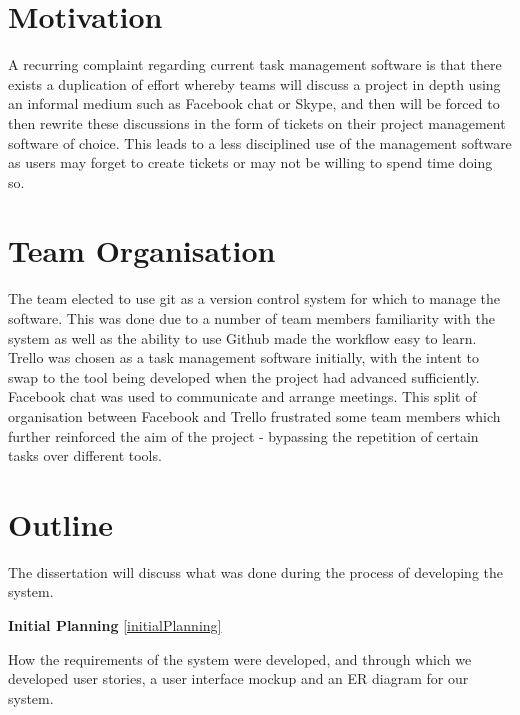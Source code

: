 \documentclass[a4paper]{l3proj}
\begin{document}
\section{Motivation}
\label{motivation}

A recurring complaint regarding current task management software is that there exists a duplication of effort whereby teams will discuss a project in depth using an informal medium such as Facebook chat or Skype, and then will be forced to then rewrite these discussions in the form of tickets on their project management software of choice.  This leads to a less disciplined use of the management software as users may forget to create tickets or may not be willing to spend time doing so.

\section{Team Organisation}
\label{teamOrganisation}

The team elected to use git as a version control system for which to manage the software.  This was done due to a number of team members familiarity with the system as well as the ability to use Github made the workflow easy to learn.  Trello was chosen as a task management software initially, with the intent to swap to the tool being developed when the project had advanced sufficiently.  Facebook chat was used to communicate and arrange meetings.  This split of organisation between Facebook and Trello frustrated some team members which further reinforced the aim of the project - bypassing the repetition of certain tasks over different tools.

\section{Outline}
\label{outline}

The dissertation will discuss what was done during the process of developing the system.

\textbf{Initial Planning} \autoref{initialPlanning}

How the requirements of the system were developed, and through which we developed user stories, a user interface mockup and an ER diagram for our system.
\end{document}
